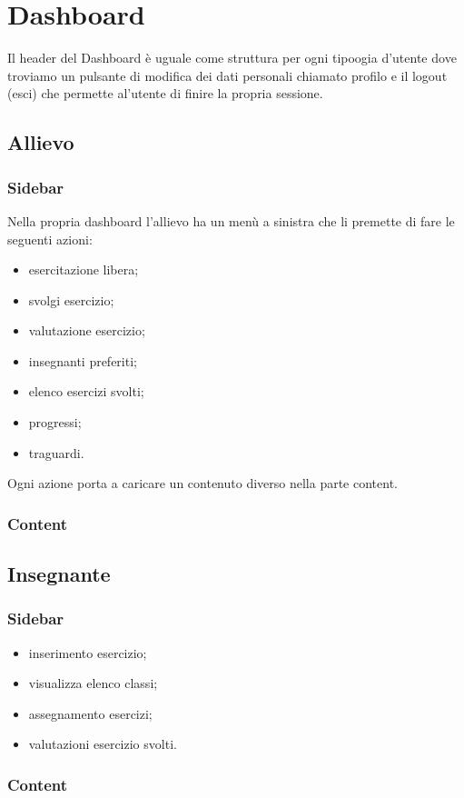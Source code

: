\section{{Dashboard}}
Il header del Dashboard è uguale come struttura per ogni tipoogia  d'utente dove troviamo un pulsante di modifica dei dati personali chiamato profilo e il logout (esci) che permette al'utente  di finire la propria sessione.
\subsection{Allievo}
\subsubsection{Sidebar}
Nella propria dashboard l'allievo ha un menù a sinistra che li premette di fare le seguenti azioni:
\begin{itemize}
\item esercitazione libera;
\item svolgi esercizio;
\item valutazione esercizio;
\item insegnanti preferiti;
\item elenco esercizi svolti;
\item progressi;
\item traguardi.
\end{itemize}
Ogni azione porta a caricare un contenuto diverso nella parte content.
\subsubsection{Content}
\subsection{Insegnante}
\subsubsection{Sidebar}
\begin{itemize}
\item inserimento esercizio;
\item visualizza elenco classi;
\item assegnamento esercizi;
\item valutazioni esercizio svolti.
\end{itemize}

\subsubsection{Content}
